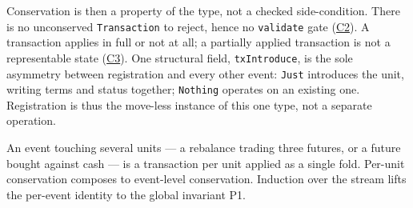 Conservation is then a property of the type, not a checked side-condition. There is no
unconserved \texttt{Transaction} to reject, hence no \texttt{validate} gate
(\hyperref[cond:C2]{C2}). A transaction applies in full or not at all; a partially applied
transaction is not a representable state (\hyperref[cond:C3]{C3}). One structural field,
\texttt{txIntroduce}, is the sole asymmetry between registration and every other event:
\texttt{Just} introduces the unit, writing terms and status together; \texttt{Nothing}
operates on an existing one. Registration is thus the move-less instance of this one type,
not a separate operation.

An event touching several units --- a rebalance trading three futures, or a future
bought against cash --- is a transaction per unit applied as a single fold. Per-unit
conservation composes to event-level conservation. Induction over the stream lifts the
per-event identity to the global invariant P1.

